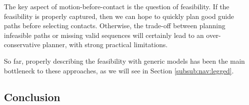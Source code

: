 
The key aspect of motion-before-contact is the question of feasibility. If the feasibility is properly captured, then we can hope to quickly plan good guide paths before selecting contacts. Otherwise, the trade-off between planning infeasible paths or missing valid sequences will certainly lead to an over-conservative planner, with strong practical limitations.

So far, properly describing the feasibility with generic models has been the main bottleneck to these approaches, as we will see in Section \ref{subsub:nav:legged}.


\subsection{Conclusion}




